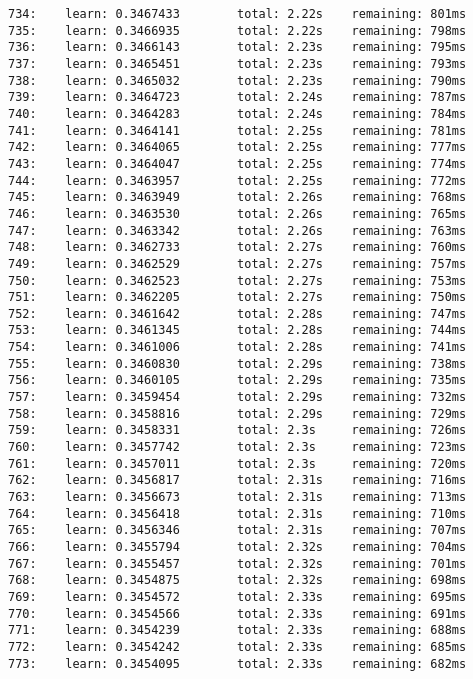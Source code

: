 \documentclass[11pt]{article}
\begin{document}
\begin{Verbatim}[commandchars=\\\{\}]
734:    learn: 0.3467433        total: 2.22s    remaining: 801ms
735:    learn: 0.3466935        total: 2.22s    remaining: 798ms
736:    learn: 0.3466143        total: 2.23s    remaining: 795ms
737:    learn: 0.3465451        total: 2.23s    remaining: 793ms
738:    learn: 0.3465032        total: 2.23s    remaining: 790ms
739:    learn: 0.3464723        total: 2.24s    remaining: 787ms
740:    learn: 0.3464283        total: 2.24s    remaining: 784ms
741:    learn: 0.3464141        total: 2.25s    remaining: 781ms
742:    learn: 0.3464065        total: 2.25s    remaining: 777ms
743:    learn: 0.3464047        total: 2.25s    remaining: 774ms
744:    learn: 0.3463957        total: 2.25s    remaining: 772ms
745:    learn: 0.3463949        total: 2.26s    remaining: 768ms
746:    learn: 0.3463530        total: 2.26s    remaining: 765ms
747:    learn: 0.3463342        total: 2.26s    remaining: 763ms
748:    learn: 0.3462733        total: 2.27s    remaining: 760ms
749:    learn: 0.3462529        total: 2.27s    remaining: 757ms
750:    learn: 0.3462523        total: 2.27s    remaining: 753ms
751:    learn: 0.3462205        total: 2.27s    remaining: 750ms
752:    learn: 0.3461642        total: 2.28s    remaining: 747ms
753:    learn: 0.3461345        total: 2.28s    remaining: 744ms
754:    learn: 0.3461006        total: 2.28s    remaining: 741ms
755:    learn: 0.3460830        total: 2.29s    remaining: 738ms
756:    learn: 0.3460105        total: 2.29s    remaining: 735ms
757:    learn: 0.3459454        total: 2.29s    remaining: 732ms
758:    learn: 0.3458816        total: 2.29s    remaining: 729ms
759:    learn: 0.3458331        total: 2.3s     remaining: 726ms
760:    learn: 0.3457742        total: 2.3s     remaining: 723ms
761:    learn: 0.3457011        total: 2.3s     remaining: 720ms
762:    learn: 0.3456817        total: 2.31s    remaining: 716ms
763:    learn: 0.3456673        total: 2.31s    remaining: 713ms
764:    learn: 0.3456418        total: 2.31s    remaining: 710ms
765:    learn: 0.3456346        total: 2.31s    remaining: 707ms
766:    learn: 0.3455794        total: 2.32s    remaining: 704ms
767:    learn: 0.3455457        total: 2.32s    remaining: 701ms
768:    learn: 0.3454875        total: 2.32s    remaining: 698ms
769:    learn: 0.3454572        total: 2.33s    remaining: 695ms
770:    learn: 0.3454566        total: 2.33s    remaining: 691ms
771:    learn: 0.3454239        total: 2.33s    remaining: 688ms
772:    learn: 0.3454242        total: 2.33s    remaining: 685ms
773:    learn: 0.3454095        total: 2.33s    remaining: 682ms

\end{Verbatim}
\end{document}
